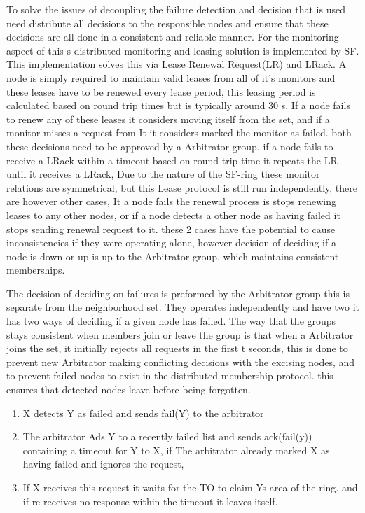 \documentclass[a4paper,10pt,titlepage]{report}
\begin{document}
    To solve the issues of decoupling the failure detection and decision that is used need distribute all decisions to the responsible nodes and ensure that these decisions are all done in a consistent and reliable manner. For the monitoring aspect of this s distributed monitoring and leasing solution is implemented by SF. This implementation solves this via Lease Renewal Request(LR) and LRack. A node is simply required to maintain valid leases from all of it's monitors and these leases have to be renewed every lease period, this leasing period is calculated based on round trip times but is typically around 30 s. If a node fails to renew any of these leases it considers moving itself from the set, and if a monitor misses a request from It it considers marked the monitor as failed. both these decisions need to be approved by a Arbitrator group. if a node fails to receive a LRack within a timeout based on round trip time it repeats the LR until it receives a LRack, Due to the nature of the SF-ring these monitor relations are symmetrical, but this Lease protocol is still run independently, there are however other cases, It a node fails the renewal process is stops renewing leases to any other nodes, or if a node detects a other node as having failed it stops sending renewal request to it. these 2 cases have the potential to cause inconsistencies if they were operating alone, however decision of deciding if a node is down or up is up to the Arbitrator group, which maintains consistent memberships. \\
    \vspace{5mm}

    The decision of deciding on failures is preformed by the Arbitrator group this is separate from the neighborhood set. They operates independently and have two it has two ways of deciding if a given node has failed. The way that the groups stays consistent when members join or leave the group is that when a Arbitrator joins the set, it initially rejects all requests in the first t seconds, this is done to prevent new Arbitrator making conflicting decisions with the excising nodes, and to prevent failed nodes to exist in the distributed membership protocol. this ensures that detected nodes leave before being forgotten.\\
    \vspace{5mm}

    \begin{enumerate}
        \item X detects Y as failed and sends fail(Y) to the arbitrator
        \item The arbitrator Ads Y to a recently failed list and sends ack(fail(y)) containing a timeout for Y to X, if The arbitrator already marked X as having failed and ignores the request,
        \item If X receives this request it waits for the TO to claim Ys area of the ring. and if re receives no response within the timeout it leaves itself.
    \end{enumerate}
\end{document}
